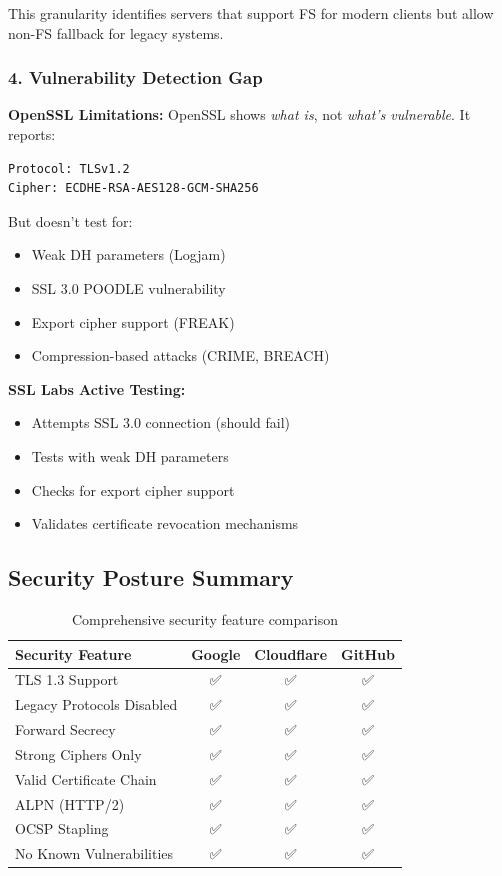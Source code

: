 \documentclass[12pt,a4paper]{article}
\begin{document}
This granularity identifies servers that support FS for modern clients but allow non-FS fallback for legacy systems.

\subsubsection{4. Vulnerability Detection Gap}

\textbf{OpenSSL Limitations:}
OpenSSL shows \textit{what is}, not \textit{what's vulnerable}. It reports:
\begin{lstlisting}[style=outputstyle]
Protocol: TLSv1.2
Cipher: ECDHE-RSA-AES128-GCM-SHA256
\end{lstlisting}

But doesn't test for:
\begin{itemize}
    \item Weak DH parameters (Logjam)
    \item SSL 3.0 POODLE vulnerability
    \item Export cipher support (FREAK)
    \item Compression-based attacks (CRIME, BREACH)
\end{itemize}

\textbf{SSL Labs Active Testing:}
\begin{itemize}
    \item Attempts SSL 3.0 connection (should fail)
    \item Tests with weak DH parameters
    \item Checks for export cipher support
    \item Validates certificate revocation mechanisms
\end{itemize}

\subsection{Security Posture Summary}

\begin{table}[H]
\centering
\begin{tabular}{@{}lccc@{}}
\toprule
\textbf{Security Feature} & \textbf{Google} & \textbf{Cloudflare} & \textbf{GitHub} \\ \midrule
TLS 1.3 Support & ✅ & ✅ & ✅ \\
Legacy Protocols Disabled & ✅ & ✅ & ✅ \\
Forward Secrecy & ✅ & ✅ & ✅ \\
Strong Ciphers Only & ✅ & ✅ & ✅ \\
Valid Certificate Chain & ✅ & ✅ & ✅ \\
ALPN (HTTP/2) & ✅ & ✅ & ✅ \\
OCSP Stapling & ✅ & ✅ & ✅ \\
No Known Vulnerabilities & ✅ & ✅ & ✅ \\
\bottomrule
\end{tabular}
\caption{Comprehensive security feature comparison}
\end{table}
\end{document}
